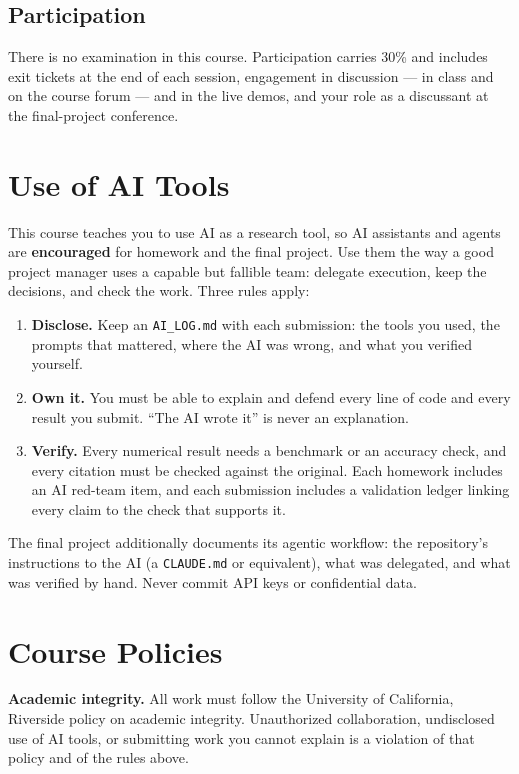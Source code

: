 \documentclass[11pt]{article}
\begin{document}
\subsection{Participation}
There is no examination in this course. Participation carries 30\% and includes exit tickets at the end of each session, engagement in discussion --- in class and on the course forum --- and in the live demos, and your role as a discussant at the final-project conference.

\section{Use of AI Tools}\label{sec:ai}

This course teaches you to use AI as a research tool, so AI assistants and agents are \textbf{encouraged} for homework and the final project. Use them the way a good project manager uses a capable but fallible team: delegate execution, keep the decisions, and check the work. Three rules apply:
\begin{enumerate}
  \item \textbf{Disclose.} Keep an \texttt{AI\_LOG.md} with each submission: the tools you used, the prompts that mattered, where the AI was wrong, and what you verified yourself.
  \item \textbf{Own it.} You must be able to explain and defend every line of code and every result you submit. ``The AI wrote it'' is never an explanation.
  \item \textbf{Verify.} Every numerical result needs a benchmark or an accuracy check, and every citation must be checked against the original. Each homework includes an AI red-team item, and each submission includes a validation ledger linking every claim to the check that supports it.
\end{enumerate}
The final project additionally documents its agentic workflow: the repository's instructions to the AI (a \texttt{CLAUDE.md} or equivalent), what was delegated, and what was verified by hand. Never commit API keys or confidential data.

\section{Course Policies}

\textbf{Academic integrity.} All work must follow the University of California, Riverside policy on academic integrity. Unauthorized collaboration, undisclosed use of AI tools, or submitting work you cannot explain is a violation of that policy and of the rules above.
\end{document}

